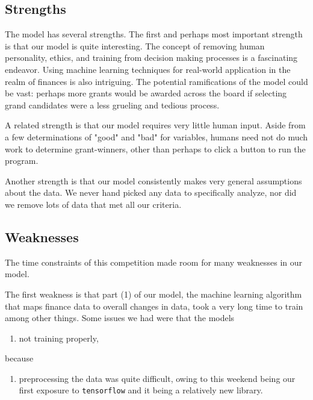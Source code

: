 \documentclass[paper.tex]{subfiles}
\begin{document}
	\subsection{Strengths}
	The model has several strengths. The first and perhaps most important strength is that our model is quite interesting. The concept of removing human personality, ethics, and training from decision making processes is a fascinating endeavor. Using machine learning techniques for real-world application in the realm of finances is also intriguing. The potential ramifications of the model could be vast: perhaps more grants would be awarded across the board if selecting grand candidates were a less grueling and tedious process. 
	
	A related strength is that our model requires very little human input. Aside from a few determinations of "good" and "bad" for variables, humans need not do much work to determine grant-winners, other than perhaps to click a button to run the program.
	
	Another strength is that our model consistently makes very general assumptions about the data. We never hand picked any data to specifically analyze, nor did we remove lots of data that met all our criteria. 
		
	\subsection{Weaknesses}
	The time constraints of this competition made room for many weaknesses in our model.
	
	The first weakness is that part (1) of our model, the machine learning algorithm that maps finance data to overall changes in data, took a very long time to train among other things. Some issues we had were that the models 
\begin{enumerate}
\item not training properly, 
\end{enumerate}
because
\begin{enumerate}[resume]
\item preprocessing the data was quite difficult, owing to this weekend being our first exposure to \texttt{tensorflow} and it being a relatively new library.
\end{enumerate}	
\end{document}
